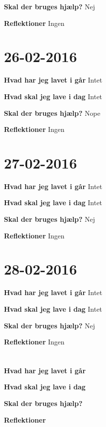\documentclass{article}
\begin{document}
	\textbf{Skal der bruges hjælp?} Nej
	
	\textbf{Reflektioner} Ingen
	
	\section{26-02-2016}
	
	\textbf{Hvad har jeg lavet i går} Intet
	
	\textbf{Hvad skal jeg lave i dag} Intet
	
	\textbf{Skal der bruges hjælp?} Nope
	
	\textbf{Reflektioner} Ingen
	
	\section{27-02-2016}
	
	\textbf{Hvad har jeg lavet i går} Intet
	
	\textbf{Hvad skal jeg lave i dag} Intet
	
	\textbf{Skal der bruges hjælp?} Nej
	
	\textbf{Reflektioner} Ingen
	
	\section{28-02-2016}
	
	\textbf{Hvad har jeg lavet i går} Intet
	
	\textbf{Hvad skal jeg lave i dag} Intet
	
	\textbf{Skal der bruges hjælp?} Nej
	
	\textbf{Reflektioner} Ingen
	
	\section{}
	
	\textbf{Hvad har jeg lavet i går}
	
	\textbf{Hvad skal jeg lave i dag}
	
	\textbf{Skal der bruges hjælp?}
	
	\textbf{Reflektioner}
	
	
\end{document}
